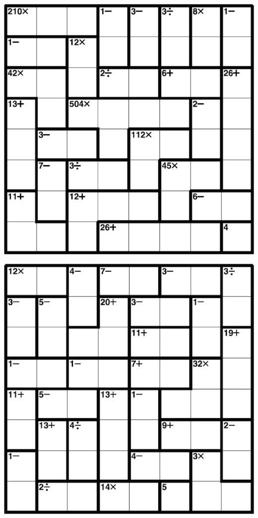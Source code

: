 
\includegraphics[scale=1]{Gambar/Lampiran/8x8_3.png}

\includegraphics[scale=1]{Gambar/Lampiran/8x8_4.png}
